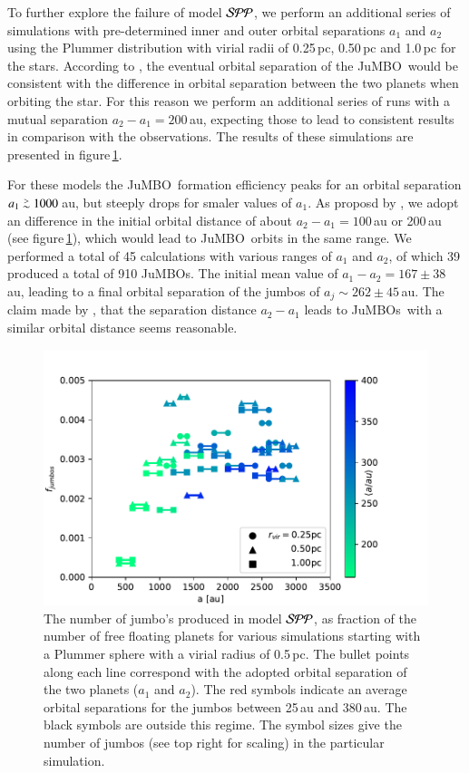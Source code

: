 \documentclass[aa]{lib/aa}
\def\apgt{\ {\raise-.5ex\hbox{$\buildrel>\over\sim$}}\ }
\newcommand{\jumbo}{\mbox{JuMBO}}
\newcommand{\jumbos}{\mbox{JuMBOs}}
\begin{document}
To further explore the failure of model ${\cal SPP}$, we perform an
additional series of simulations with pre-determined inner and outer
orbital separations $a_1$ and $a_2$ using the Plummer distribution
with virial radii of 0.25\,pc, 0.50\,pc and 1.0\,pc for the stars.
According to \cite{2023arXiv231006016W}, the eventual orbital
separation of the \jumbo\, would be consistent with the difference in
orbital separation between the two planets when orbiting the star. For
this reason we perform an additional series of runs with a mutual
separation $a_2-a_1 = 200$\,au, expecting those to lead to consistent
results in comparison with the observations.  The results of these
simulations are presented in figure\,\ref{Fig:fjumbos_from_PP}.

For these models the \jumbo\, formation efficiency peaks for an
orbital separation $a_1 \apgt 1000$\,au, but steeply drops for smaler
values of $a_1$. As proposd by \cite{2023arXiv231006016W}, we adopt an
difference in the initial orbital distance of about $a_2-a_1 =
100$\,au or 200\,au (see figure\,\ref{Fig:fjumbos_from_PP}), which
would lead to \jumbo\, orbits in the same range.  We performed a total
of 45 calculations with various ranges of $a_1$ and $a_2$, of which 39
produced a total of 910 \jumbos. The initial mean value of $a_1-a_2 =
167\pm38$\,au, leading to a final orbital separation of the jumbos of
$a_j \sim 262\pm45$\,au.  The claim made by
\cite{2023arXiv231006016W}, that the separation distance $a_2-a_1$
leads to \jumbos\, with a similar orbital distance seems reasonable.

\begin{figure}
    \centering
        \includegraphics[width=.91\columnwidth]{figures/fig_fjumbos_from_psystems.pdf}
        \caption{The number of jumbo's produced in model ${\cal SPP}$,
          as fraction of the number of free floating planets for
          various simulations starting with a Plummer sphere with a
          virial radius of 0.5\,pc.  The bullet points along each line
          correspond with the adopted orbital separation of the two
          planets ($a_1$ and $a_2$).  The red symbols indicate an
          average orbital separations for the jumbos between 25\,au
          and 380\,au.  The black symbols are outside this regime.
          The symbol sizes give the number of jumbos (see top right
          for scaling) in the particular simulation.  }
         \label{Fig:fjumbos_from_PP}
\end{figure}
\end{document}
